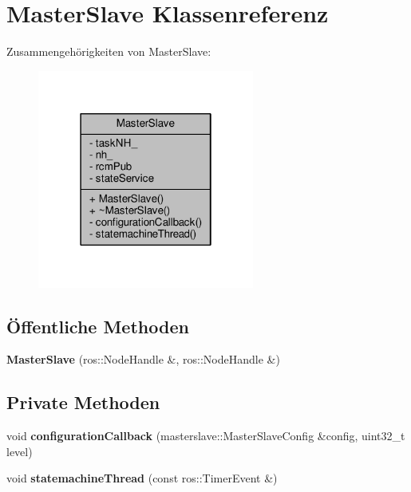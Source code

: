 \hypertarget{classMasterSlave}{\section{Master\-Slave Klassenreferenz}
\label{classMasterSlave}
}


Zusammengehörigkeiten von Master\-Slave\-:
\nopagebreak
\begin{figure}[H]
\begin{center}
\leavevmode
\includegraphics[width=202pt]{classMasterSlave__coll__graph}
\end{center}
\end{figure}
\subsection*{Öffentliche Methoden}
\begin{DoxyCompactItemize}
\item 
\hypertarget{classMasterSlave_ab5290259fb581b7742a37db37a6a4137}{{\bfseries Master\-Slave} (ros\-::\-Node\-Handle \&, ros\-::\-Node\-Handle \&)}\label{classMasterSlave_ab5290259fb581b7742a37db37a6a4137}

\end{DoxyCompactItemize}
\subsection*{Private Methoden}
\begin{DoxyCompactItemize}
\item 
\hypertarget{classMasterSlave_ac61a3fde8040d7467d64ee0fbdb3421a}{void {\bfseries configuration\-Callback} (masterslave\-::\-Master\-Slave\-Config \&config, uint32\-\_\-t level)}\label{classMasterSlave_ac61a3fde8040d7467d64ee0fbdb3421a}

\item 
\hypertarget{classMasterSlave_a3085b599a52c3d3f08fce578699e9fb1}{void {\bfseries statemachine\-Thread} (const ros\-::\-Timer\-Event \&)}\label{classMasterSlave_a3085b599a52c3d3f08fce578699e9fb1}

\end{DoxyCompactItemize}
